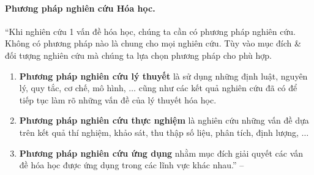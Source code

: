\documentclass{article}
\numberwithin{equation}{section}
\begin{document}
\paragraph{Phương pháp nghiên cứu Hóa học.} ``Khi nghiên cứu 1 vấn đề hóa học, chúng ta cần có phương pháp nghiên cứu. Không có phương pháp nào là chung cho mọi nghiên cứu. Tùy vào mục đích \& đối tượng nghiên cứu mà chúng ta lựa chọn phương pháp cho phù hợp.
\begin{enumerate}
	\item \textbf{Phương pháp nghiên cứu lý thuyết} là sử dụng những định luật, nguyên lý, quy tắc, cơ chế, mô hình, $\ldots$ cũng như các kết quả nghiên cứu đã có để tiếp tục làm rõ những vấn đề của lý thuyết hóa học.
	\item \textbf{Phương pháp nghiên cứu thực nghiệm} là nghiên cứu những vấn đề dựa trên kết quả thí nghiệm, khảo sát, thu thập số liệu, phân tích, định lượng, $\ldots$
	\item \textbf{Phương pháp nghiên cứu ứng dụng} nhằm mục đích giải quyết các vấn đề hóa học được ứng dụng trong các lĩnh vực khác nhau.'' -- \cite[p. 10]{SGK_Hoa_Hoc_10_Chan_Troi_Sang_Tao}
\end{enumerate}
\end{document}
